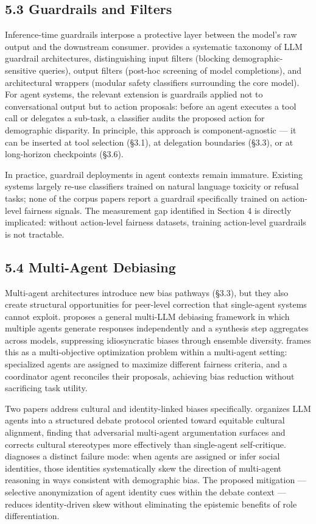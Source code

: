 \documentclass[sigconf,nonacm]{acmart}
\begin{document}
\subsection{5.3 Guardrails and Filters}

Inference-time guardrails interpose a protective layer between the model's raw output and the downstream consumer. \cite{dong2024building} provides a systematic taxonomy of LLM guardrail architectures, distinguishing input filters (blocking demographic-sensitive queries), output filters (post-hoc screening of model completions), and architectural wrappers (modular safety classifiers surrounding the core model). For agent systems, the relevant extension is guardrails applied not to conversational output but to action proposals: before an agent executes a tool call or delegates a sub-task, a classifier audits the proposed action for demographic disparity. In principle, this approach is component-agnostic — it can be inserted at tool selection (§3.1), at delegation boundaries (§3.3), or at long-horizon checkpoints (§3.6).

In practice, guardrail deployments in agent contexts remain immature. Existing systems largely re-use classifiers trained on natural language toxicity or refusal tasks; none of the corpus papers report a guardrail specifically trained on action-level fairness signals. The measurement gap identified in Section 4 is directly implicated: without action-level fairness datasets, training action-level guardrails is not tractable.

\subsection{5.4 Multi-Agent Debiasing}

Multi-agent architectures introduce new bias pathways (§3.3), but they also create structural opportunities for peer-level correction that single-agent systems cannot exploit. \cite{owens2024multi} proposes a general multi-LLM debiasing framework in which multiple agents generate responses independently and a synthesis step aggregates across models, suppressing idiosyncratic biases through ensemble diversity. \cite{xu2024mitigating} frames this as a multi-objective optimization problem within a multi-agent setting: specialized agents are assigned to maximize different fairness criteria, and a coordinator agent reconciles their proposals, achieving bias reduction without sacrificing task utility.

Two papers address cultural and identity-linked biases specifically. \cite{ki2025multiple} organizes LLM agents into a structured debate protocol oriented toward equitable cultural alignment, finding that adversarial multi-agent argumentation surfaces and corrects cultural stereotypes more effectively than single-agent self-critique. \cite{choi2025identity} diagnoses a distinct failure mode: when agents are assigned or infer social identities, those identities systematically skew the direction of multi-agent reasoning in ways consistent with demographic bias. The proposed mitigation — selective anonymization of agent identity cues within the debate context — reduces identity-driven skew without eliminating the epistemic benefits of role differentiation.
\end{document}
